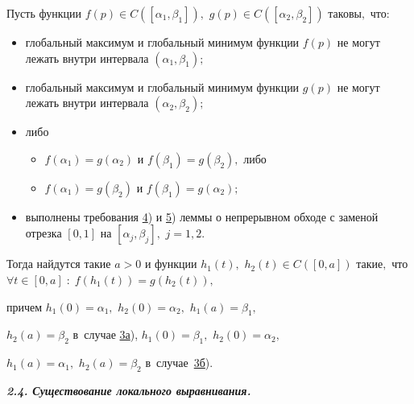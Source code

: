 \begin{lemma}Пусть функции $f(p)\in C([\alpha_1,\beta_1]),$ $g(p)\in C([\alpha_2,\beta_2])$ таковы$,$ что{\/\rm:}

\begin{itemize}

\item[\rm 1)] глобальный максимум и глобальный минимум функции $f(p)$ не могут лежать внутри интервала $(\alpha_1,\beta_1);$

\item[\rm 2)] глобальный максимум и глобальный минимум функции $g(p)$ не могут лежать внутри интервала $(\alpha_2,\beta_2);$

\item[\rm 3)] либо

\begin{itemize}

\item[\rm 3а)] \hypertarget{myp:3a}{} $f(\alpha_1)=g(\alpha_2)$ и $f(\beta_1)=g(\beta_2),$ либо

\item[\rm 3б)] \hypertarget{myp:3b}{} $f(\alpha_1)=g(\beta_2)$ и $f(\beta_1)=g(\alpha_2);$

\end{itemize}

\item[\rm 4)] выполнены требования {\rm  \hyperlink{myp:4}{4})} и\/ {\rm  \hyperlink{myp:5}{5})} леммы о непрерывном обходе с заменой отрезка $[0,1]$ на $[\alpha_j,\beta_j],$ $j=1,2.$

\end{itemize}

\smallskip



Тогда найдутся такие $a>0$ и функции $h_1(t),$ $h_2(t)\in C([0,a])$ такие$,$ что $\forall t\in[0,a]\;:\;f(h_1(t))=g(h_2(t)),$ 

причем $h_1(0)=\alpha_1,$ $h_2(0)=\alpha_2,$ $h_1(a)=\beta_1,$

$h_2(a)=\beta_2$ в~случае {\rm \hyperlink{myp:3a}{3а}),} $h_1(0)=\beta_1,$ $h_2(0)=\alpha_2,$

$h_1(a)=\alpha_1,$ $h_2(a)=\beta_2$ в~случае~{\rm \hyperlink{myp:3b}{3б}).}

\end{lemma}



\smallskip



{\bf \itshape 2.4. Существование локального выравнивания.}



